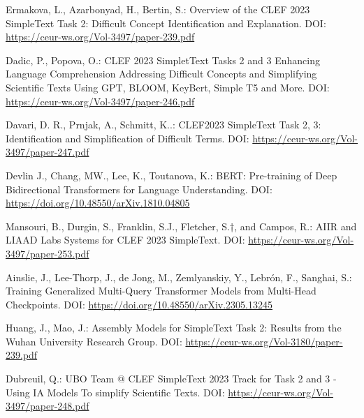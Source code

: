 \documentclass[runningheads]{llncs}
\begin{document}
\begin{thebibliography}{99}

Ermakova, L., Azarbonyad, H., Bertin, S.: Overview of the CLEF 2023 SimpleText Task 2: Difficult Concept Identification and Explanation. DOI: \url{https://ceur-ws.org/Vol-3497/paper-239.pdf}

Dadic, P., Popova, O.: CLEF 2023 SimpletText Tasks 2 and 3 Enhancing Language Comprehension Addressing Difficult Concepts and Simplifying Scientific Texts Using GPT, BLOOM, KeyBert, Simple T5 and More. DOI: \url{https://ceur-ws.org/Vol-3497/paper-246.pdf}

Davari, D. R., Prnjak, A., Schmitt, K..: CLEF2023 SimpleText Task 2, 3: Identification and Simplification of Difficult Terms. DOI: \url{https://ceur-ws.org/Vol-3497/paper-247.pdf}

Devlin J., Chang, MW., Lee, K., Toutanova, K.: BERT: Pre-training of Deep Bidirectional Transformers for Language Understanding. DOI: \url{https://doi.org/10.48550/arXiv.1810.04805}

Mansouri, B., Durgin, S., Franklin, S.J., Fletcher, S.†, and Campos, R.: AIIR and LIAAD Labs Systems for CLEF 2023 SimpleText. DOI: \url{https://ceur-ws.org/Vol-3497/paper-253.pdf}

Ainslie, J., Lee-Thorp, J., de Jong, M., Zemlyanskiy, Y., Lebrón, F., Sanghai, S.: Training Generalized Multi-Query Transformer Models from Multi-Head Checkpoints. DOI: \url{https://doi.org/10.48550/arXiv.2305.13245}

Huang, J., Mao, J.: Assembly Models for SimpleText Task 2: Results from the Wuhan University Research Group. DOI: \url{https://ceur-ws.org/Vol-3180/paper-239.pdf}

Dubreuil, Q.: UBO Team @ CLEF SimpleText 2023 Track for Task 2 and 3 - Using IA Models To simplify Scientific Texts. DOI: \url{https://ceur-ws.org/Vol-3497/paper-248.pdf}


\end{thebibliography}
\end{document}
